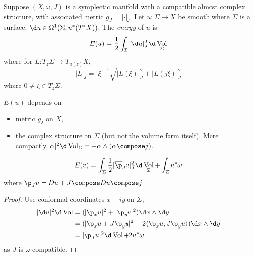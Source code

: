 \documentclass[a4paper]{article}
\newcommand{\w}{\wedge} %
\DeclareMathOperator{\Vol}{Vol} %
\begin{document}
\begin{definition}[energy]
  Suppose \((X, \omega, J)\) is a symplectic manifold with a compatible almost complex structure, with associated metric \(g_J = |\cdot|_J\). Let \(u: \Sigma \to X\) be smooth where \(\Sigma\) is a surface. \(\d u \in \Omega^1(\Sigma, u^*(T^*X))\). The \emph{energy} of \(u\) is
  \[
    E(u) = \frac{1}{2} \int_\Sigma |\d u|^2_J \d\Vol_\Sigma
  \]
  where for \(L: T_z \Sigma \to T_{u(z)} X\),
  \[
    |L|_J = |\xi|^{-1} \sqrt{|L(\xi)|^2_J + |L(j\xi)|^2_J}
  \]
  where \(0 \ne \xi \in T_z\Sigma\).
\end{definition}

\begin{note}
  \(E(u)\) depends on
  \begin{itemize}
  \item metric \(g_J\) on \(X\),
  \item the complex structure on \(\Sigma\) (but not the volume form itself). More compactly,\(|\alpha|^2 \d \Vol_\Sigma = -\alpha \w (\alpha \compose j)\).
  \end{itemize}
\end{note}

\begin{lemma}
  \[
    E(u) = \int_\Sigma \frac{1}{2} |\overline \p_J u|_J^2 \d \Vol_\Sigma + \int_\Sigma u^* \omega
  \]
  where \(\overline \p_J u = D u + J \compose Du \compose j\).
\end{lemma}

\begin{proof}
  Use conformal coordinates \(x + iy\) on \(\Sigma\),
  \begin{align*}
    |\d u|^2 \d \Vol
    &= (|\p_x u|^2 + |\p_y u|^2) \d x \w \d y \\
    &= (|\p_x u + J \p_y u|^2 + 2 \langle \p_x u, J \p_y u \rangle) \d x \w \d y \\
    &= |\p_J u|^2 \d \Vol + 2 u^*\omega
  \end{align*}
  as \(J\) is \(\omega\)-compatible.
\end{proof}
\end{document}
